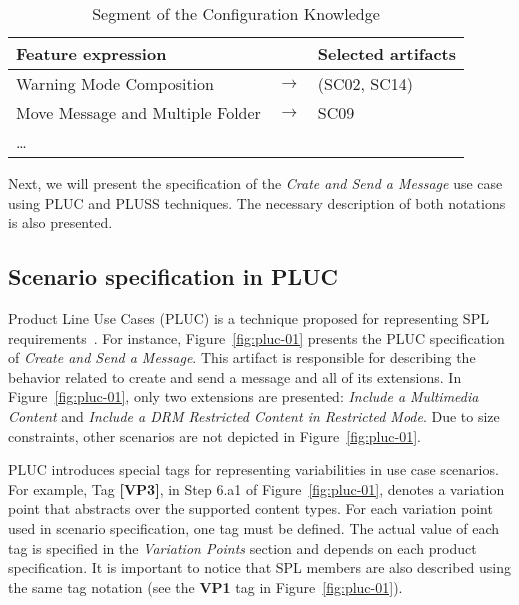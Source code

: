 \documentclass{acm_proc_article-sp}
\begin{document}
\begin{table}[htb]
\centering
\caption{Segment of the Configuration Knowledge}
\label{tab:ck-sample}
\begin{small}
\begin{tabular}{|lcl|} \hline
 Feature expression & & Selected artifacts \\ \hline
 Warning Mode Composition & $ \rightarrow$ & (SC02, SC14) \\ \hline
 Move Message and Multiple Folder & $\rightarrow$ & SC09 \\ \hline
 \ldots & & \\ \hline
\end{tabular}
\end{small}
\end{table}



Next, we will present the specification of the \emph{Crate and Send a Message} use case using PLUC and PLUSS techniques. The necessary description of both notations is also presented.  

\subsection{Scenario specification in PLUC}
\label{sub:pluc}

Product Line Use Cases (PLUC) is a technique proposed for representing SPL requirements~\cite{bertolino-esec-2003}.  For instance, Figure~\ref{fig:pluc-01} presents 
the PLUC specification of \emph{Create and Send a Message}. This artifact is responsible for describing the behavior related to create and send a message and 
all of its extensions. In Figure~\ref{fig:pluc-01}, only two extensions are presented: \emph{Include a Multimedia Content} and 
\emph{Include a DRM Restricted Content in Restricted Mode}. Due to size constraints, other scenarios are not depicted in Figure~\ref{fig:pluc-01}. 


PLUC introduces special tags for representing variabilities in use case scenarios.  For example, Tag {\bf [VP3]}, in Step 6.a1 of Figure~\ref{fig:pluc-01}, denotes a variation 
point that abstracts over the supported content types. For each variation point used in scenario specification, one tag must be defined.
The actual value of each tag is specified in the \emph{Variation Points} section and depends on each product specification. It is important to notice 
that SPL members are also described using the same tag notation (see the {\bf VP1} tag in Figure~\ref{fig:pluc-01}). 
\end{document}
